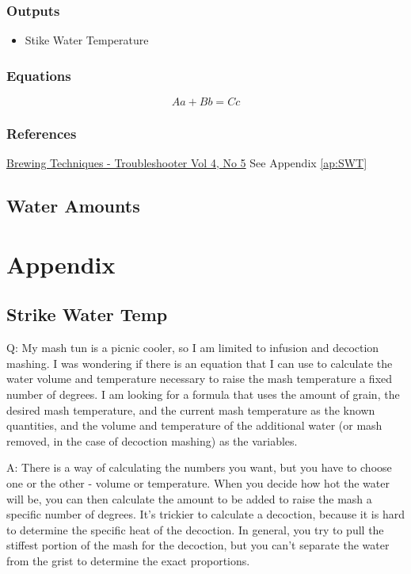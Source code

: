 \documentclass[letterpaper,12pt]{article}
\begin{document}
\subsubsection*{Outputs}
\begin{itemize}
 \item Stike Water Temperature
\end{itemize}

\subsubsection*{Equations}
\begin{equation}
Aa + Bb = Cc
\end{equation}


\subsubsection*{References}
\href{http://brewingtechniques.com/library/backissues/issue4.5/miller.html}{Brewing Techniques - Troubleshooter Vol 4, No 5} \newline
See Appendix \ref{ap:SWT}


\subsection*{Water Amounts}

\section{Appendix}
\subsection{Strike Water Temp\label{ap:SWT}}
Q: My mash tun is a picnic cooler, so I am limited to infusion and decoction mashing. I was wondering if there is an equation that I can use to calculate the water volume and temperature necessary to raise the mash temperature a fixed number of degrees. I am looking for a formula that uses the amount of grain, the desired mash temperature, and the current mash temperature as the known quantities, and the volume and temperature of the additional water (or mash removed, in the case of decoction mashing) as the variables.

A: There is a way of calculating the numbers you want, but you have to choose one or the other - volume or temperature. When you decide how hot the water will be, you can then calculate the amount to be added to raise the mash a specific number of degrees. It's trickier to calculate a decoction, because it is hard to determine the specific heat of the decoction. In general, you try to pull the stiffest portion of the mash for the decoction, but you can't separate the water from the grist to determine the exact proportions.
\end{document}

